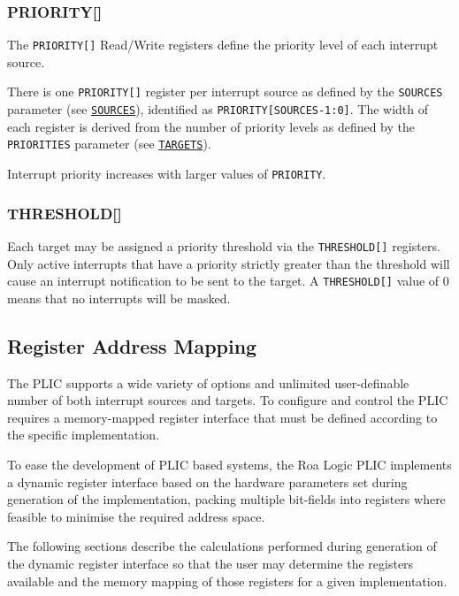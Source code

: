 \documentclass[]{article}
\begin{document}
\subsubsection{PRIORITY[]}

The \texttt{PRIORITY[]} Read/Write
registers define the priority level of each interrupt source.

There is one \texttt{PRIORITY[]}
register per interrupt source as defined by the \texttt{SOURCES}
parameter (see \protect\hyperlink{SOURCES}{\texttt{SOURCES}}), identified as
\texttt{PRIORITY[SOURCES-1:0]}. The
width of each register is derived from the number of priority levels as
defined by the \texttt{PRIORITIES} parameter (see
\protect\hyperlink{TARGETS}{\texttt{TARGETS}}).

Interrupt priority increases with larger values of \texttt{PRIORITY}.

\subsubsection{THRESHOLD[]}

Each target may be assigned a priority threshold via the
\texttt{THRESHOLD[]} registers. Only
active interrupts that have a priority strictly greater than the
threshold will cause an interrupt notification to be sent to the target.
A \texttt{THRESHOLD[]} value of 0
means that no interrupts will be masked.

\subsection{Register Address Mapping}

The PLIC supports a wide variety of options and unlimited user-definable
number of both interrupt sources and targets. To configure and control
the PLIC requires a memory-mapped register interface that must be
defined according to the specific implementation.

To ease the development of PLIC based systems, the Roa Logic PLIC
implements a dynamic register interface based on the hardware parameters
set during generation of the implementation, packing multiple bit-fields
into registers where feasible to minimise the required address space.

The following sections describe the calculations performed during
generation of the dynamic register interface so that the user may
determine the registers available and the memory mapping of those
registers for a given implementation.
\end{document}
